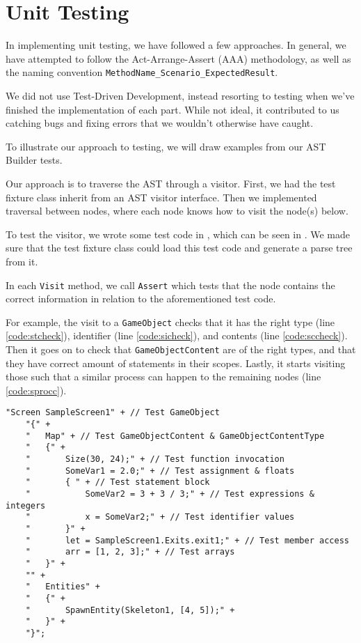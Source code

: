 \section{Unit Testing}
In implementing unit testing, we have followed a few approaches.
In general, we have attempted to follow the Act-Arrange-Assert (AAA)
methodology, as well as the naming convention 
\texttt{MethodName\_Scenario\_ExpectedResult}.

We did not use Test-Driven Development, instead resorting to testing
when we've finished the implementation of each part. While not ideal, it
contributed to us catching bugs and fixing errors that we wouldn't
otherwise have caught.

To illustrate our approach to testing, we will draw examples from our
AST Builder tests.

Our approach is to traverse the AST through a visitor. First,
we had the test fixture class inherit from an AST visitor interface.
Then we implemented traversal between nodes, where each node knows how
to visit the node(s) below.

To test the visitor, we wrote some test code in \dazel{}, which can be seen in . We made sure that
the test fixture class could load this test code and generate a parse
tree from it.

In each \texttt{Visit} method, we call \texttt{Assert} which tests
that the node contains the correct information in relation to the
aforementioned \dazel{} test code.

For example, the visit to a \texttt{GameObject} checks that it has the
right type (line \ref{code:stcheck}), identifier (line \ref{code:sicheck}), and contents (line \ref{code:sccheck}). Then it goes on to check that
\texttt{GameObjectContent} are of the right types, and that they have
correct amount of statements in their scopes. Lastly, it starts visiting
those such that a similar process can happen to the remaining nodes (line \ref{code:sprocc}).

\begin{lstlisting}[caption={AST Builder \dazel{} test code}, label={lst:asttestcode}]
    "Screen SampleScreen1" + // Test GameObject
    "{" +
    "   Map" + // Test GameObjectContent & GameObjectContentType
    "   {" +
    "       Size(30, 24);" + // Test function invocation
    "       SomeVar1 = 2.0;" + // Test assignment & floats
    "       { " + // Test statement block
    "           SomeVar2 = 3 + 3 / 3;" + // Test expressions & integers
    "           x = SomeVar2;" + // Test identifier values
    "       }" +
    "       let = SampleScreen1.Exits.exit1;" + // Test member access 
    "       arr = [1, 2, 3];" + // Test arrays
    "   }" +
    "" +
    "   Entities" +
    "   {" +
    "       SpawnEntity(Skeleton1, [4, 5]);" +
    "   }" +
    "}";
    \end{lstlisting}


